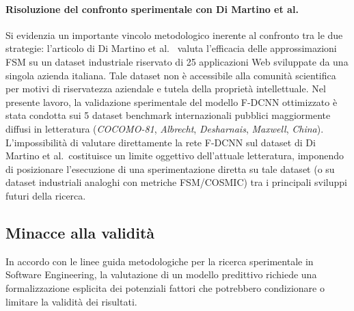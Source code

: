 \documentclass[11pt, a4paper]{article}
\begin{document}
\paragraph{Risoluzione del confronto sperimentale con Di Martino et al.}
Si evidenzia un importante vincolo metodologico inerente al confronto tra le due strategie: l'articolo di Di Martino et al.~\cite{DIMARTINO2020106308} valuta l'efficacia delle approssimazioni FSM su un dataset industriale riservato di 25 applicazioni Web sviluppate da una singola azienda italiana. Tale dataset non è accessibile alla comunità scientifica per motivi di riservatezza aziendale e tutela della proprietà intellettuale. Nel presente lavoro, la validazione sperimentale del modello F-DCNN ottimizzato è stata condotta sui 5 dataset benchmark internazionali pubblici maggiormente diffusi in letteratura (\textit{COCOMO-81}, \textit{Albrecht}, \textit{Desharnais}, \textit{Maxwell}, \textit{China}). L'impossibilità di valutare direttamente la rete F-DCNN sul dataset di Di Martino et al.\ costituisce un limite oggettivo dell'attuale letteratura, imponendo di posizionare l'esecuzione di una sperimentazione diretta su tale dataset (o su dataset industriali analoghi con metriche FSM/COSMIC) tra i principali sviluppi futuri della ricerca.

\subsection{Minacce alla validità}\label{sec:minacce_validita}
In accordo con le linee guida metodologiche per la ricerca sperimentale in Software Engineering, la valutazione di un modello predittivo richiede una formalizzazione esplicita dei potenziali fattori che potrebbero condizionare o limitare la validità dei risultati.
\end{document}
